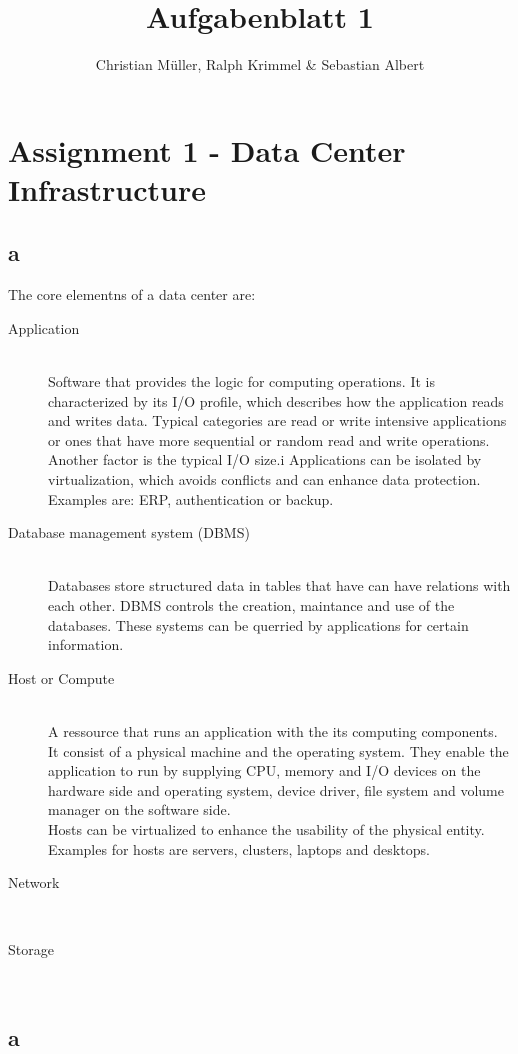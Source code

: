 \documentclass{article}
\begin{document}
\title{Aufgabenblatt 1}
\author{Christian Müller, Ralph Krimmel \& Sebastian Albert }

\maketitle


\section{Assignment 1 - Data Center Infrastructure}

\subsection{a}
	The core elementns of a data center are:\\
	\begin{description}
		\item[Application] \hfill \\
			Software that provides the logic for computing operations.
			It is characterized by its I/O profile,
			which describes how the application reads and writes data.
			Typical categories are read or write intensive applications
			or ones that have more sequential or random read and write operations.
			Another factor is the typical I/O size.i
			Applications can be isolated by virtualization,
			which avoids conflicts and can enhance data protection.\\
			Examples are: ERP, authentication or backup.

		\item[Database management system (DBMS)] \hfill \\
			Databases store structured data in tables that have can have relations with each other.
			DBMS controls the creation, maintance and use of the databases.
			These systems can be querried by applications for certain information.
			
		\item[Host or Compute] \hfill \\
			A ressource that runs an application with the its computing components.
			It consist of a physical machine and the operating system.
			They enable the application to run by supplying CPU, memory and I/O devices on the hardware side
			and operating system, device driver, file system and volume manager on the software side.\\
			Hosts can be virtualized to enhance the usability of the physical entity.
			Examples for hosts are servers, clusters, laptops and desktops.

		\item[Network] \hfill \\
		\item[Storage] \hfill \\
	\end{description}




\subsection{a}
\end{document}
